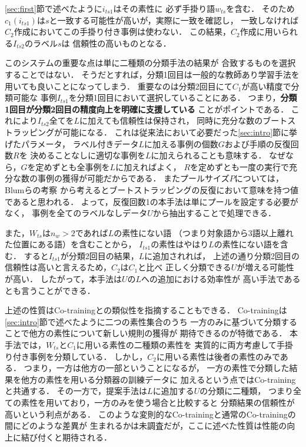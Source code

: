 \documentclass[japanese]{jnlp_1.4}
\begin{document}
\ref{sec:first}節で述べたように$i_{ts1}$はその素性に
必ず手掛り語$w_{ts}$を含む．
そのため$c_1(i_{ts1})$は$s$と一致する可能性が高いが，実際に一致を確認し，
一致しなければ$C_2$作成においてこの手掛り付き事例は使わない．
この結果，$C_2$作成に用いられる$I_{ts2}$のラベル$s$は
信頼性の高いものとなる．

このシステムの重要な点は単に二種類の分類手法の結果が
合致するものを選択することではない．
そうだとすれば，分類1回目は一般的な教師あり学習手法を
用いても良いことになってしまう．
重要なのは分類2回目にて$C_1$が高い精度で分類可能な
事例$I_{ts1}$を分類1回目において選択していることにある．
つまり，{\bf 分類1回目が分類2回目の精度向上を明確に支援している}
ことがポイントである．
これにより$I_{ts2}$全てを$L$に加えても信頼性は保持され，
同時に充分な数のブートストラッピングが可能になる．
これは従来法において必要だった\ref{sec:intro}節に挙げたパラメータ，
ラベル付きデータ$L$に加える事例の個数$G$および手順の反復回数$R$を
決めることなしに適切な事例を$L$に加えられることも意味する．
なぜなら，$G$を定めずとも全事例を$L$に加えればよく，
$R$を定めずとも一度の実行で充分な数の事例の獲得が可能だからである．
またプールサイズ$P$については，Blumらの考察\cite{Blum98}
から考えるとブートストラッピングの反復において意味を持つ値であると思われる．
よって，反復回数1の本手法は単にプールを設定する必要がなく，
事例を全てのラベルなしデータ$U$から抽出することで処理できる．

また，$W_{ts}$は$n_w>2$であれば$L$の素性にない語
（つまり対象語から3語以上離れた位置にある語）を含むことから，
$I_{ts1}$の素性はやはり$L$の素性にない語を含む．
すると$I_{ts1}$が分類2回目の結果，$L$に追加されれば，
上述の通り分類2回目の信頼性は高いと言えるため，$C_2$は$C_1$と比べ
正しく分類できる$U$が増える可能性が高い．
したがって，本手法は$U$の$L$への追加における効率性が
高い手法であるとも言うことができる．

上述の性質はCo-trainingとの類似性を指摘することもできる．
Co-trainingは\ref{sec:intro}節で述べたように二つの素性集合のうち
一方のみに基づいて分類することで他方の素性について新しい規則の獲得が
期待できるのが特徴である．
本手法では，$W_{ts}$と$C_1$に用いる素性の二種類の素性を
実質的に両方考慮して手掛り付き事例を分類している．
しかし，$C_2$に用いる素性は後者の素性のみである．
つまり，一方は他方の一部ということになるが，
一方の素性で分類した結果を他方の素性を用いる分類器の訓練データに
加えるという点ではCo-trainingと共通する．
その一方で，提案手法は$L$に追加する$U$の分類に二種類，
つまり全ての素性を用いており，一方のみを使う場合と比較すると
分類結果の信頼性が高いという利点がある．
このような変則的なCo-trainingと通常のCo-trainingの間にどのような差異が
生まれるかは未調査だが，ここに述べた性質は性能の向上に結び付くと期待される．
\end{document}
